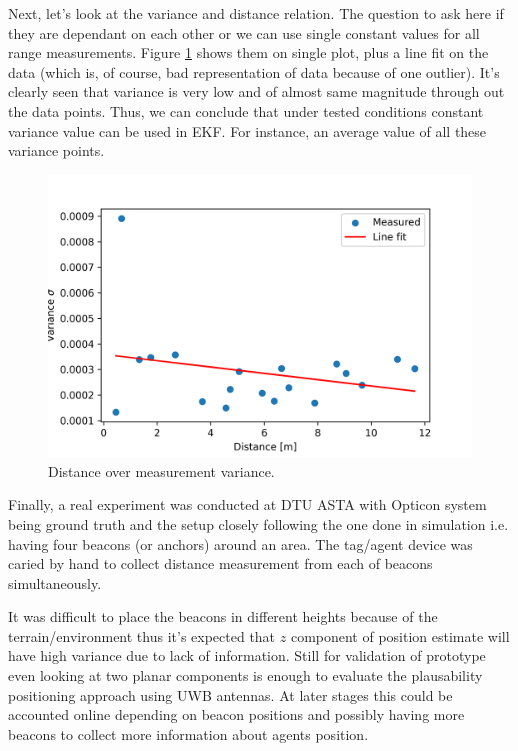 Next, let's look at the variance and distance relation. The question to ask here if they are dependant on each other or we can use single constant values for all range measurements. Figure \ref{fig:distance_var} shows them on single plot, plus a line fit on the data (which is, of course, bad representation of data because of one outlier). It's clearly seen that variance is very low and of almost same magnitude through out the data points. Thus, we can conclude that under tested conditions constant variance value can be used in EKF. For instance, an average value of all these variance points.
\begin{figure}[H]
    \centering
    \includegraphics[width=\linewidth]{figures/dist_variance.png}
    \caption{Distance over measurement variance.}
    \label{fig:distance_var}
\end{figure}

Finally, a real experiment was conducted at DTU ASTA with Opticon system being ground truth and the setup closely following the one done in simulation i.e. having four beacons (or anchors) around an area. The tag/agent device was caried by hand to collect distance measurement from each of beacons simultaneously. 

It was difficult to place the beacons in different heights because of the terrain/environment thus it's expected that $z$ component of position estimate will have high variance due to lack of information. Still for validation of prototype even looking at two planar components is enough to evaluate the plausability positioning approach using UWB antennas. At later stages this could be accounted online depending on beacon positions and possibly having more beacons to collect more information about agents position. 

